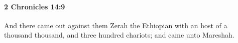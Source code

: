 
		\paragraph{2 Chronicles 14:9} %
			\label{2CHRONICLES-14-9}

			And there came out against them Zerah the Ethiopian with an host of a thousand thousand, and three hundred chariots; and came unto Mareshah.


